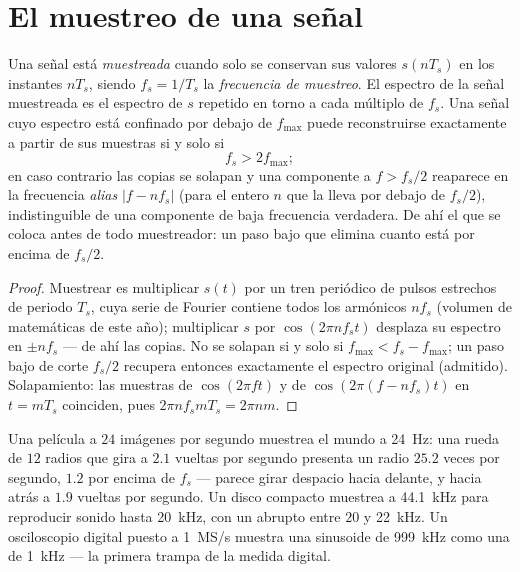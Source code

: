 \section{El muestreo de una señal}

\begin{theorem}\label{thm:b2:feedback-oscillators:shannon}
Una señal está \emph{muestreada} cuando solo se conservan sus valores
$s(nT_s)$ en los instantes $nT_s$, siendo $f_s = 1/T_s$ la
\emph{frecuencia de muestreo}. El espectro de la señal muestreada es el
espectro de $s$ repetido en torno a cada múltiplo de $f_s$. Una señal cuyo
espectro está confinado por debajo de $f_{\max}$ puede reconstruirse
exactamente a partir de sus muestras si y solo si
\[
f_s > 2f_{\max} ;
\]
en caso contrario las copias se solapan y una componente a $f > f_s/2$
reaparece en la frecuencia \emph{alias} $|f - nf_s|$ (para el entero $n$
que la lleva por debajo de $f_s/2$), indistinguible de una componente de
baja frecuencia verdadera. De ahí el \emph{} que se
coloca antes de todo muestreador: un paso bajo que elimina cuanto está por encima de $f_s/2$.
\end{theorem}

\begin{proof}
Muestrear es multiplicar $s(t)$ por un tren periódico de pulsos estrechos
de periodo $T_s$, cuya serie de Fourier contiene todos los armónicos $nf_s$
(volumen de matemáticas de este año); multiplicar $s$ por $\cos(2\pi nf_st)$
desplaza su espectro en $\pm nf_s$ --- de ahí las copias. No se solapan si
y solo si $f_{\max} < f_s - f_{\max}$; un paso bajo de corte $f_s/2$
recupera entonces exactamente el espectro original (admitido). Solapamiento: las
muestras de $\cos(2\pi ft)$ y de $\cos(2\pi(f - nf_s)t)$ en $t = mT_s$
coinciden, pues $2\pi nf_smT_s = 2\pi nm$.
\end{proof}

\begin{example}\label{ex:b2:feedback-oscillators:alias}
Una película a $24$ imágenes por segundo muestrea el mundo a \qty{24}{Hz}:
una rueda de $12$ radios que gira a $2.1$ vueltas por segundo presenta un
radio $25.2$ veces por segundo, $1.2$ por encima de $f_s$ --- parece girar
despacio hacia delante, y hacia atrás a $1.9$ vueltas por segundo. Un
disco compacto muestrea a \qty{44.1}{kHz} para reproducir sonido hasta
\qty{20}{kHz}, con un  abrupto entre $20$ y \qty{22}{kHz}. Un osciloscopio
digital puesto a \qty{1}{MS/s} muestra una sinusoide de \qty{999}{kHz} como una de \qty{1}{kHz} ---
la primera trampa de la medida digital.
\end{example}

